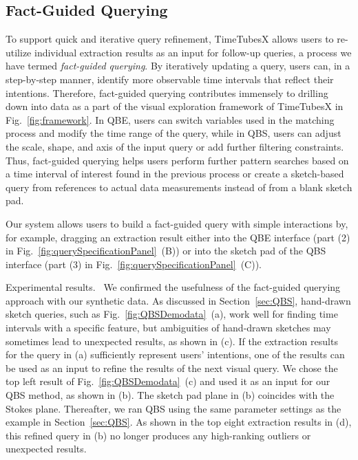 \subsection{Fact-Guided Querying}\label{sec:factDrivenQuerying}
To support quick and iterative query refinement, TimeTubesX allows users to re-utilize individual extraction results as an input for follow-up queries, a process we have termed \emph{fact-guided querying}.
By iteratively updating a query, users can, in a step-by-step manner, identify more observable time intervals that reflect their intentions.
Therefore, fact-guided querying contributes immensely to drilling down into data as a part of the visual exploration framework of TimeTubesX in Fig.~\ref{fig:framework}.
In QBE, users can switch variables used in the matching process and modify the time range of the query, while in QBS, users can adjust the scale, shape, and axis of the input query or add further filtering constraints.
Thus, fact-guided querying helps users perform further pattern searches based on a time interval of interest found in the previous process or create a sketch-based query from references to actual data measurements instead of from a blank sketch pad.

Our system allows users to build a fact-guided query with simple interactions by, for example, dragging an extraction result either into the QBE interface (part (2) in Fig.~\ref{fig:querySpecificationPanel}~(B)) or into the sketch pad of the QBS interface (part (3) in Fig.~\ref{fig:querySpecificationPanel}~(C)).

\textsf{Experimental results.\ } We confirmed the usefulness of the fact-guided querying approach with our synthetic data.
As discussed in Section~\ref{sec:QBS}, 
hand-drawn sketch queries, such as Fig.~\ref{fig:QBSDemodata}~(a), work well for finding time intervals with a specific feature,
but ambiguities of hand-drawn sketches may sometimes lead to unexpected results, as shown in (c).
If the extraction results for the query in (a) sufficiently represent users' intentions, one of the results can be used as an input to refine the results of the next visual query.
We chose the top left result of Fig.~\ref{fig:QBSDemodata}~(c) and used it as an input for our QBS method, as shown in (b). 
The sketch pad plane in (b) coincides with the Stokes plane.
Thereafter, we ran QBS using the same parameter settings as the example in Section~\ref{sec:QBS}.
As shown in the top eight extraction results in (d),  
this refined query in (b) no longer produces any high-ranking outliers or unexpected results.